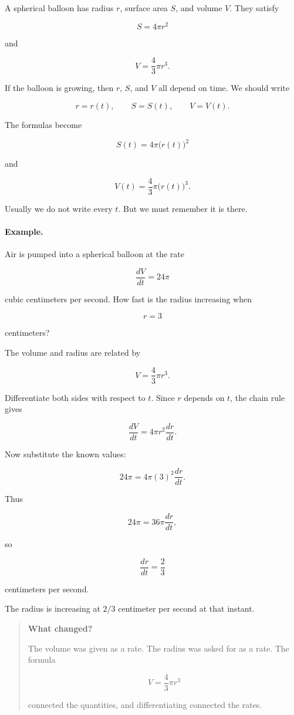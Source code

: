 A spherical balloon has radius \(r\), surface area \(S\), and volume \(V\).  They satisfy

\[
S=4\pi r^2
\]

and

\[
V=\frac43\pi r^3.
\]

If the balloon is growing, then \(r\), \(S\), and \(V\) all depend on time.  We should
write

\[
r=r(t),\qquad S=S(t),\qquad V=V(t).
\]

The formulas become

\[
S(t)=4\pi \bigl(r(t)\bigr)^2
\]

and

\[
V(t)=\frac43\pi \bigl(r(t)\bigr)^3.
\]

Usually we do not write every \(t\).  But we must remember it is there.

\paragraph{Example.}
Air is pumped into a spherical balloon at the rate

\[
\frac{dV}{dt}=24\pi
\]

cubic centimeters per second.  How fast is the radius increasing when

\[
r=3
\]

centimeters?

The volume and radius are related by

\[
V=\frac43\pi r^3.
\]

Differentiate both sides with respect to \(t\).  Since \(r\) depends on \(t\), the chain rule
gives

\[
\frac{dV}{dt}
=
4\pi r^2\frac{dr}{dt}.
\]

Now substitute the known values:

\[
24\pi=4\pi(3)^2\frac{dr}{dt}.
\]

Thus

\[
24\pi=36\pi\frac{dr}{dt},
\]

so

\[
\boxed{
\frac{dr}{dt}=\frac23
}
\]

centimeters per second.

The radius is increasing at \(2/3\) centimeter per second at that instant.

\begin{quote}
\textbf{What changed?}

The volume was given as a rate.  The radius was asked for as a rate.  The formula

\[
V=\frac43\pi r^3
\]

connected the quantities, and differentiating connected the rates.
\end{quote}

